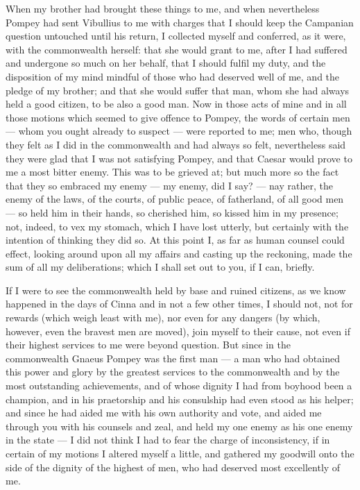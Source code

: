  When my brother had brought these things to me, and when nevertheless Pompey had sent Vibullius to me with charges that I should keep the Campanian question untouched until his return, I collected myself and conferred, as it were, with the commonwealth herself: that she would grant to me, after I had suffered and undergone so much on her behalf, that I should fulfil my duty, and the disposition of my mind mindful of those who had deserved well of me, and the pledge of my brother; and that she would suffer that man, whom she had always held a good citizen, to be also a good man. Now in those acts of mine and in all those motions which seemed to give offence to Pompey, the words of certain men --- whom you ought already to suspect --- were reported to me; men who, though they felt as I did in the commonwealth and had always so felt, nevertheless said they were glad that I was not satisfying Pompey, and that Caesar would prove to me a most bitter enemy. This was to be grieved at; but much more so the fact that they so embraced my enemy --- my enemy, did I say? --- nay rather, the enemy of the laws, of the courts, of public peace, of fatherland, of all good men --- so held him in their hands, so cherished him, so kissed him in my presence; not, indeed, to vex my stomach, which I have lost utterly, but certainly with the intention of thinking they did so. At this point I, as far as human counsel could effect, looking around upon all my affairs and casting up the reckoning, made the sum of all my deliberations; which I shall set out to you, if I can, briefly.

 If I were to see the commonwealth held by base and ruined citizens, as we know happened in the days of Cinna and in not a few other times, I should not, not for rewards (which weigh least with me), nor even for any dangers (by which, however, even the bravest men are moved), join myself to their cause, not even if their highest services to me were beyond question. But since in the commonwealth Gnaeus Pompey was the first man --- a man who had obtained this power and glory by the greatest services to the commonwealth and by the most outstanding achievements, and of whose dignity I had from boyhood been a champion, and in his praetorship and his consulship had even stood as his helper; and since he had aided me with his own authority and vote, and aided me through you with his counsels and zeal, and held my one enemy as his one enemy in the state --- I did not think I had to fear the charge of inconsistency, if in certain of my motions I altered myself a little, and gathered my goodwill onto the side of the dignity of the highest of men, who had deserved most excellently of me.

